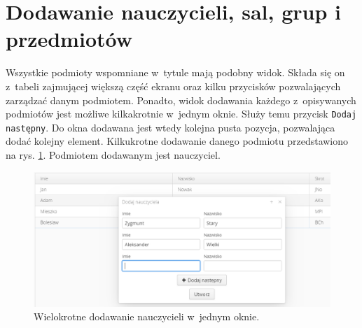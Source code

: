 \documentclass[a4paper]{book}
\begin{document}
{\section{Dodawanie nauczycieli, sal, grup i przedmiotów}
Wszystkie podmioty wspomniane w~tytule mają podobny widok. Składa się on z~tabeli zajmującej większą część ekranu oraz kilku przycisków pozwalających zarządzać danym podmiotem. Ponadto, widok dodawania każdego z~opisywanych podmiotów jest możliwe kilkakrotnie w~jednym oknie. Służy temu przycisk \lstinline|Dodaj następny|. Do okna dodawana jest wtedy kolejna pusta pozycja, pozwalająca dodać kolejny element. Kilkukrotne dodawanie danego podmiotu przedstawiono na rys. \ref{id:fig:multiAdd}. Podmiotem dodawanym jest nauczyciel.
\begin{figure}
	\centering
	\includegraphics[width=1.0\textwidth]{./img/multiAdd.png}
	\caption{Wielokrotne dodawanie nauczycieli w~jednym oknie.}
	\label{id:fig:multiAdd}
\end{figure}

}
\end{document}
